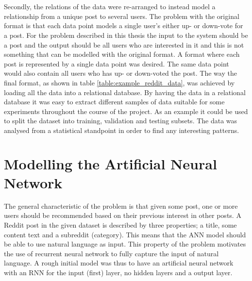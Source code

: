 \\\\
Secondly, the relations of the data were re-arranged to instead model a relationship from a unique post to several users. The problem with the original format is that each data point models a single user's either up- or down-vote for a post. For the problem described in this thesis the input to the system should be a post and the output should be all users who are interested in it and this is not something that can be modelled with the original format. A format where each post is represented by a single data point was desired. The same data point would also contain all users who has up- or down-voted the post. The way the final format, as shown in table \ref{table:example_reddit_data}, was achieved by loading all the data into a relational database. By having the data in a relational database it was easy to extract different samples of data suitable for some experiments throughout the course of the project. As an example it could be used to split the dataset into training, validation and testing subsets. The data was analysed from a statistical standpoint in order to find any interesting patterns.

\section{Modelling the Artificial Neural Network}\label{sec:modelling_the_ann}
The general characteristic of the problem is that given some post, one or more users should be recommended based on their previous interest in other posts. A Reddit post in the given dataset is described by three properties; a title, some content text and a subreddit (category). This means that the ANN model should be able to use natural language as input. This property of the problem motivates the use of recurrent neural network to fully capture the input of natural language. A rough initial model was thus to have an artificial neural network with an RNN for the input (first) layer, no hidden layers and a output layer.

